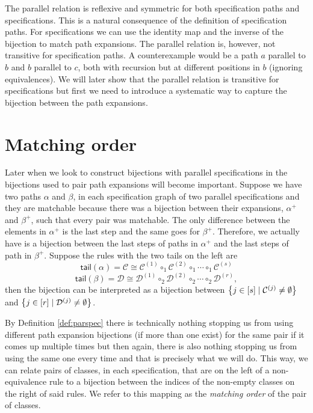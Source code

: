 The parallel relation is reflexive and symmetric for both specification paths and specifications. This is a natural consequence of the definition of specification paths. For specifications we can use the identity map and the inverse of the bijection to match path expansions. The parallel relation is, however, not transitive for specification paths. A counterexample would be a path $a$ parallel to $b$ and $b$ parallel to $c$, both with recursion but at different positions in $b$ (ignoring equivalences). We will later show that the parallel relation is transitive for specifications but first we need to introduce a systematic way to capture the bijection between the path expansions.

\section{Matching order}
Later when we look to construct bijections with parallel specifications in  the bijections used to pair path expansions will become important. Suppose we have two paths $\alpha$ and $\beta$, in each specification graph of two parallel specifications and they are matchable because there was a bijection between their expansions, $\alpha^+$ and $\beta^+$, such that every pair was matchable. The only difference between the elements in $\alpha^+$ is the last step and the same goes for $\beta^+$. Therefore, we actually have is a bijection between the last steps of paths in $\alpha^+$ and the last steps of path in $\beta^+$. Suppose the rules with the two tails on the left are
\[
    \textsf{tail}(\alpha) = \mathcal{C} \cong \mathcal{C}^{(1)} \circ_1  \mathcal{C}^{(2)} \circ_1 \dotsm \circ_1 \mathcal{C}^{(s)}
\]
\[
    \textsf{tail}(\beta) = \mathcal{D} \cong \mathcal{D}^{(1)} \circ_2  \mathcal{D}^{(2)} \circ_2 \dotsm \circ_2 \mathcal{D}^{(r)},
\]
then the bijection can be interpreted as a bijection between $\left\{j \in [s] \mid \mathcal{C}^{(j)} \neq \emptyset\right\}$
and $\left\{j \in [r] \mid \mathcal{D}^{(j)} \neq \emptyset\right\}$.

By Definition \ref{def:parspec} there is technically nothing stopping us from using different path expansion bijections (if more than one exist) for the same pair if it comes up multiple times but then again, there is also nothing stopping us from using the same one every time and that is precisely what we will do. This way, we can relate pairs of classes, in each specification, that are on the left of a non-equivalence rule to a bijection between the indices of the non-empty classes on the right of said rules. We refer to this mapping as the \emph{matching order} of the pair of classes.

